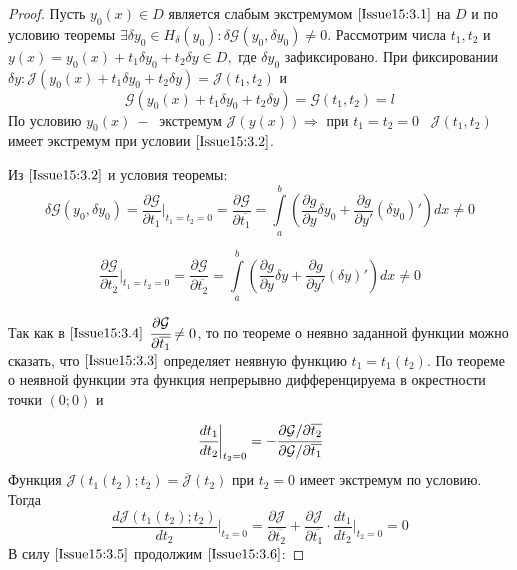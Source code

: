 \begin{proof}
	Пусть $y_0(x)\in D$ является слабым экстремумом $\eqref{Issue15:3.1}$ на $D$ и по условию теоремы $\exists \delta y_0\in H_\delta(y_0): \delta\mathcal{G}(y_0,\delta y_0)\neq 0$. Рассмотрим числа $t_1, t_2$ и $y(x)=y_0(x)+t_1\delta y_0 + t_2 \delta y \in D,$ где $\delta y_0$ зафиксировано. При фиксировании $\delta y: \mathcal{J}(y_0(x)+t_1\delta y_0+t_2 \delta y)=\mathcal{J}(t_1,t_2)$ и \begin{equation}
		\label{Issue15:3.3}
		\mathcal{G}(y_0(x)+t_1\delta y_0+t_2 \delta y)=\mathcal{G}(t_1,t_2)=l
	\end{equation}
	По условию $y_0(x)~-~$ экстремум $\mathcal{J}(y(x))\Rightarrow$ при $t_1=t_2=0\;\;\;\mathcal{J}(t_1,t_2)$ имеет экстремум при условии $\eqref{Issue15:3.2}$.

Из $\eqref{Issue15:3.2}$ и условия теоремы: 
$$\delta \mathcal{G}(y_0,\delta y_0)=\frac{\partial \mathcal{G}}{\partial t_1} \bigg|_{t_1=t_2=0} = \frac{\partial \mathcal{G}}{\partial\overline{t_1}} = \int\limits_a^b \left( \frac{\partial g}{\partial y}\delta y_0+\frac{\partial g}{\partial y'}(\delta y_0)' \right) dx \neq 0$$

\begin{equation}
	\frac{\partial \mathcal{G}}{\partial t_2} \bigg|_{t_1 = t_2 = 0} = \frac{\partial \mathcal{G}}{\partial\overline{t_2}} = \int\limits_a^b \left( \frac{\partial g}{\partial y}\delta y+\frac{\partial g}{\partial y'}(\delta y)' \right) dx \neq 0
	\label{Issue15:3.4}
\end{equation}

Так как в $\eqref{Issue15:3.4}$ $\cfrac{\partial \mathcal{G}}{\partial \overline{t_1}}\neq 0$, то по теореме о неявно заданной функции можно сказать, что $\eqref{Issue15:3.3}$ определяет неявную функцию $t_1=t_1(t_2)$. По теореме о неявной функции эта функция непрерывно дифференцируема в окрестности точки $(0;0)$ и 

\begin{equation}
    \cfrac{dt_1}{dt_2}\bigg|_{t_2 = 0} = -\cfrac{\partial \mathcal{G}/\partial \overline{t_2}}{\partial \mathcal{G}/\partial \overline{t_1}}
    \label{Issue15:3.5}
\end{equation}
Функция $\mathcal{J}(t_1(t_2);t_2)=\overline{\mathcal{J}}(t_2)$ при $t_2=0$ имеет экстремум по условию. Тогда 
\begin{equation}
    \frac{d\mathcal{J}(t_1(t_2);t_2)}{dt_2} \bigg|_{t_2=0}=\frac{\partial \mathcal{J}}{\partial \overline{t_2}}+ \frac{\partial \mathcal{J}}{\partial \overline{t_1}}\cdot \frac{d t_1}{d t_2}\bigg|_{t_2=0}=0
    \label{Issue15:3.6}
\end{equation}
В силу $\eqref{Issue15:3.5}$ продолжим $\eqref{Issue15:3.6}$: 


\end{proof}
